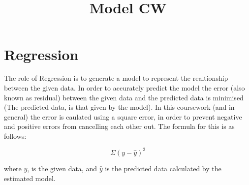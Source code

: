 \documentclass[]{article}
\title{Model CW }
\begin{document}
\maketitle

\section{Regression}
The role of Regression is to generate a model to represent the realtionship between the given data. In order to accurately predict the model the error (also known as residual) between the given data and the predicted data is minimised (The predicted data, is that given by the model). In this coursework (and in general) the error is caulated using a square error, in order to prevent negative and positive errors from cancelling each other out. The formula for this is as follows: 

\begin{equation}
  \Sigma (y - \hat{y})^2
\end {equation}

where \(y\), is the given data, and \(\hat{y}\) is the predicted data calculated by the estimated model.
\end{document}
